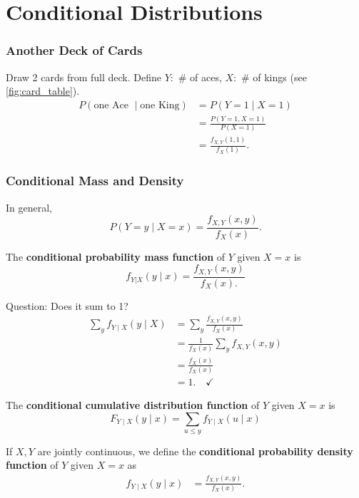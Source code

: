 
\chapter{Conditional Distributions}


\subsection{Another Deck of Cards}
\begin{eg}
		Draw 2 cards from full deck. Define $Y:$ \# of aces, $X:$ \# of kings (see \autoref{fig:card_table}).
\begin{align*}
		P(\text{one Ace } \mid \text{one King})&=P(Y=1\mid X=1)\\
									&=\frac{P(Y=1, X=1)}{P(X=1)}\\
									&=\frac{f_{X,Y}(1,1)}{f_X(1)}.
\end{align*}
\end{eg}

\subsection{Conditional Mass and Density}
In general,
$$
P(Y=y\mid X=x)=\frac{f_{X,Y}(x,y)}{f_X(x)}.
$$
\begin{definition}
The \textbf{conditional probability mass function} of $Y$ given $X=x$ is
$$
f_{Y|X}(y\mid x)=\frac{f_{X,Y}(x,y)}{f_X(x).}
$$
\end{definition}
Question: Does it sum to 1?
\begin{align*}
    \sum_yf_{Y\mid X}(y\mid X)&=\sum_y\frac{f_{X,Y}(x,y)}{f_X(x)}\\
    &=\frac{1}{f_X(x)}\sum_yf_{X,Y}(x,y)\\
    &=\frac{f_X(x)}{f_X(x)} \\
    &=1. \quad \checkmark
    \end{align*}
\begin{definition}
		The \textbf{conditional cumulative distribution function} of $Y$ given $X=x$ is
$$
F_{Y\mid X}(y\mid x)=\sum_{u\leq y}f_{Y\mid X}(u\mid x)
$$
\end{definition}
\begin{definition}
If $X,Y$ are jointly continuous, we define the \textbf{conditional probability density function} of $Y$ given $X=x$ as
\begin{align*}
f_{Y\mid X}(y\mid x)&=\frac{f_{X,Y}(x,y)}{f_X(x)}.
\end{align*}
\end{definition}

